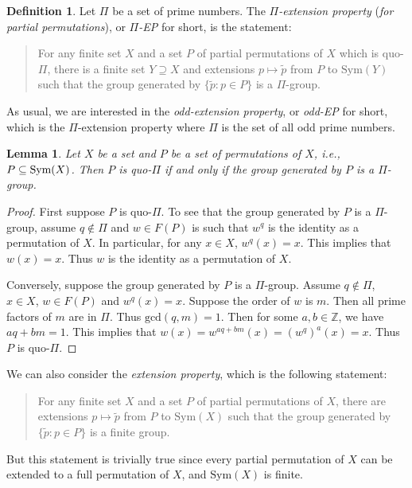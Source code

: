 \documentclass[11pt]{amsart}
\newtheorem{lemma}[theorem]{Lemma}
\theoremstyle{definition}
\newtheorem{definition}[theorem]{Definition}
\theoremstyle{definition}
\numberwithin{equation}{section}
\begin{document}
\begin{definition} Let $\Pi$ be a set of prime numbers. The {\em $\Pi$-extension property} ({\em for partial permutations}), or {\em $\Pi$-EP} for short, is the statement:
\begin{quote}
For any finite set $X$ and a set $P$ of partial permutations of $X$ which is quo-$\Pi$, there is a finite set $Y\supseteq X$ and extensions $p\mapsto \tilde{p}$ from $P$ to $\mbox{Sym}(Y)$ such that the group generated by $\{\tilde{p}\colon p\in P\}$ is a $\Pi$-group.
\end{quote}
\end{definition}

As usual, we are interested in the {\em odd-extension property}, or {\em odd-EP} for short, which is the $\Pi$-extension property where $\Pi$ is the set of all odd prime numbers. 

\begin{lemma}\label{lem:fullPi} Let $X$ be a set and $P$ be a set of permutations of $X$, i.e., $P\subseteq\mbox{\rm Sym}(X)$. Then $P$ is quo-$\Pi$ if and only if the group generated by $P$ is a $\Pi$-group.
\end{lemma}

\begin{proof} First suppose $P$ is quo-$\Pi$. To see that the group generated by $P$ is a $\Pi$-group, assume $q\not\in \Pi$ and $w\in F(P)$ is such that $w^q$ is the identity as a permutation of $X$. In particular, for any $x\in X$, $w^q(x)=x$. This implies that $w(x)=x$. Thus $w$ is the identity as a permutation of $X$. 

Conversely, suppose the group generated by $P$ is a $\Pi$-group. Assume $q\not\in\Pi$, $x\in X$, $w\in F(P)$ and $w^q(x)=x$. Suppose the order of $w$ is $m$. Then all prime factors of $m$ are in $\Pi$. Thus $\mbox{gcd}(q, m)=1$. Then for some $a, b\in \mathbb{Z}$, we have $aq+bm=1$. This implies that $w(x)=w^{aq+bm}(x)=(w^q)^a(x)=x$. Thus $P$ is quo-$\Pi$.
\end{proof}

We can also consider the {\em extension property}, which is the following statement:
\begin{quote}
For any finite set $X$ and a set $P$ of partial permutations of $X$, there are extensions $p\mapsto \tilde{p}$ from $P$ to $\mbox{Sym}(X)$ such that the group generated by $\{\tilde{p}\colon p\in P\}$ is a finite group.
\end{quote}
But this statement is trivially true since every partial permutation of $X$ can be extended to a full permutation of $X$, and $\mbox{Sym}(X)$ is finite. 
\end{document}
